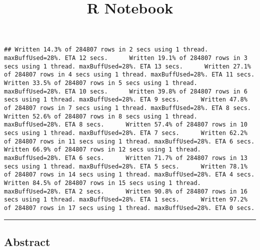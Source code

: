 \documentclass[
]{article}
\title{R Notebook}
\author{}
\date{\vspace{-2.5em}}
\begin{document}
\maketitle

\begin{verbatim}
## Written 14.3% of 284807 rows in 2 secs using 1 thread. maxBuffUsed=28%. ETA 12 secs.      Written 19.1% of 284807 rows in 3 secs using 1 thread. maxBuffUsed=28%. ETA 13 secs.      Written 27.1% of 284807 rows in 4 secs using 1 thread. maxBuffUsed=28%. ETA 11 secs.      Written 33.5% of 284807 rows in 5 secs using 1 thread. maxBuffUsed=28%. ETA 10 secs.      Written 39.8% of 284807 rows in 6 secs using 1 thread. maxBuffUsed=28%. ETA 9 secs.      Written 47.8% of 284807 rows in 7 secs using 1 thread. maxBuffUsed=28%. ETA 8 secs.      Written 52.6% of 284807 rows in 8 secs using 1 thread. maxBuffUsed=28%. ETA 8 secs.      Written 57.4% of 284807 rows in 10 secs using 1 thread. maxBuffUsed=28%. ETA 7 secs.      Written 62.2% of 284807 rows in 11 secs using 1 thread. maxBuffUsed=28%. ETA 6 secs.      Written 66.9% of 284807 rows in 12 secs using 1 thread. maxBuffUsed=28%. ETA 6 secs.      Written 71.7% of 284807 rows in 13 secs using 1 thread. maxBuffUsed=28%. ETA 5 secs.      Written 78.1% of 284807 rows in 14 secs using 1 thread. maxBuffUsed=28%. ETA 4 secs.      Written 84.5% of 284807 rows in 15 secs using 1 thread. maxBuffUsed=28%. ETA 2 secs.      Written 90.8% of 284807 rows in 16 secs using 1 thread. maxBuffUsed=28%. ETA 1 secs.      Written 97.2% of 284807 rows in 17 secs using 1 thread. maxBuffUsed=28%. ETA 0 secs.                                                                                                                                           
\end{verbatim}

\begin{center}\rule{0.5\linewidth}{0.5pt}\end{center}

\hypertarget{abstract}{%
\subsection{Abstract}\label{abstract}}
\end{document}
